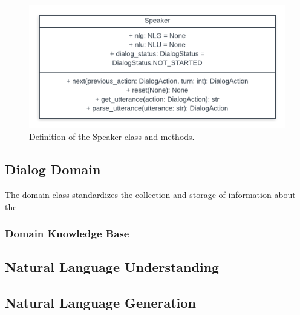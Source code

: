 \begin{figure}[h!]
	\includegraphics[width=\linewidth]{diagrams/speaker_class.png}
	\caption{ Definition of the Speaker class and methods.}
	\label{fig:speaker_class}
\end{figure}



\subsection{Dialog Domain}

The domain class standardizes the collection and storage of information about the 

\subsubsection{Domain Knowledge Base}


\subsection{Natural Language Understanding}

\subsection{Natural Language Generation}




